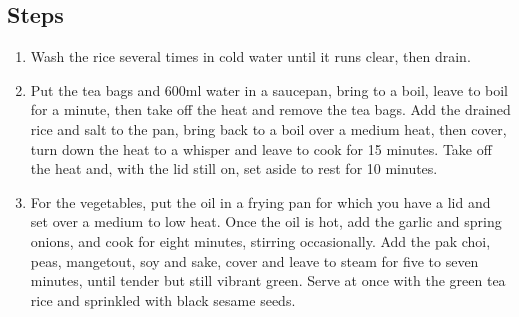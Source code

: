 \documentclass{book}
\begin{document}
\subsection*{Steps}
\begin{enumerate}
\item Wash the rice several times in cold water until it runs clear, then drain.
\item Put the tea bags and 600ml water in a saucepan, bring to a boil, leave to boil for a minute, then take off the heat and remove the tea bags. Add the drained rice and salt to the pan, bring back to a boil over a medium heat, then cover, turn down the heat to a whisper and leave to cook for 15 minutes. Take off the heat and, with the lid still on, set aside to rest for 10 minutes.
\item For the vegetables, put the oil in a frying pan for which you have a lid and set over a medium to low heat. Once the oil is hot, add the garlic and spring onions, and cook for eight minutes, stirring occasionally. Add the pak choi, peas, mangetout, soy and sake, cover and leave to steam for five to seven minutes, until tender but still vibrant green. Serve at once with the green tea rice and sprinkled with black sesame seeds.
\end{enumerate}
\newpage
\end{document}
